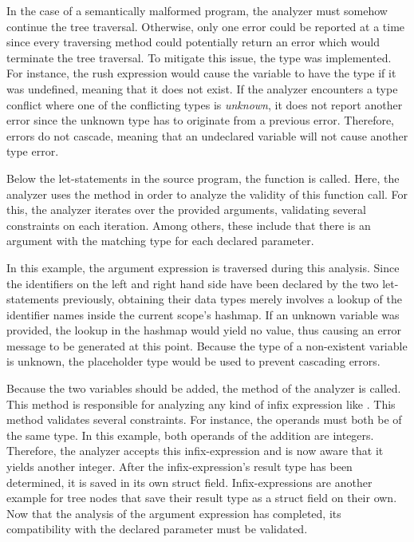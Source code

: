 In the case of a semantically malformed program, the analyzer must somehow continue the tree traversal.
Otherwise, only one error could be reported at a time since every traversing method could potentially return an error which would terminate the tree traversal.
To mitigate this issue, the  type was implemented.
For instance, the rush expression  would cause the  variable to have the  type if it was undefined, meaning that it does not exist.
If the analyzer encounters a type conflict where one of the conflicting types is \emph{unknown},
it does not report another error since the unknown type has to originate from a previous error.
Therefore, errors do not cascade, meaning that an undeclared variable will not cause another type error.

Below the let-statements in the source program, the  function is called.
Here, the analyzer uses the  method in order to analyze the validity of this function call.
For this, the analyzer iterates over the provided arguments, validating several constraints on each iteration.
Among others, these include that there is an argument with the matching type for each declared parameter.

In this example, the argument expression  is traversed during this analysis.
Since the identifiers on the left and right hand side have been declared by the two let-statements previously,
obtaining their data types merely involves a lookup of the identifier names inside the current scope's hashmap.
If an unknown variable was provided, the lookup in the hashmap would yield no value, thus causing an error message to be generated at this point.
Because the type of a non-existent variable is unknown, the placeholder  type would be used to prevent cascading errors.

Because the two variables should be added, the method  of the analyzer is called.
This method is responsible for analyzing any kind of infix expression like .
This method validates several constraints.
For instance, the operands must both be of the same type.
In this example, both operands of the addition are integers.
Therefore, the analyzer accepts this infix-expression and is now aware that it yields another integer.
After the infix-expression's result type has been determined, it is saved in its own  struct field.
Infix-expressions are another example for tree nodes that save their result type as a struct field on their own.
Now that the analysis of the argument expression has completed, its compatibility with the declared parameter must be validated.

